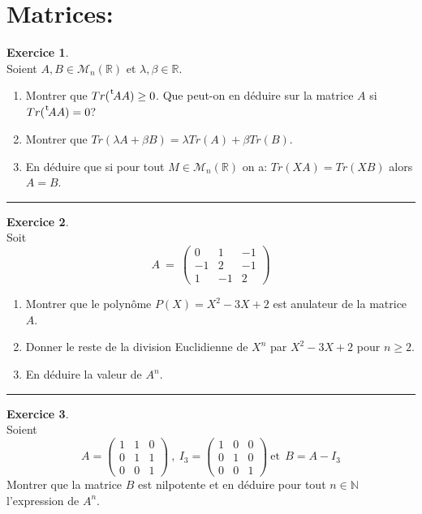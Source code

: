 \documentclass[a4paper,10pt]{article}
\theoremstyle{definition}
\theoremstyle{definition}
\newtheorem{exo}{Exercice}
\newcommand*{\transp}[2][-3mu]{\ensuremath{\mskip1mu\prescript{\smash{\mathrm t\mkern#1}}{}{\mathstrut#2}}}%
\newcommand{\R}{\mathbb{R}}
\newcommand{\N}{\mathbb{N}}
\begin{document}
\section*{Matrices:}
\begin{minipage}{1\linewidth}
\begin{minipage}[t]{0.48\linewidth}
\raggedright

\begin{exo}\quad\\
Soient  $A,B\in\mathcal{M}_{n}\left(\R\right)$ et $\lambda,\beta\in\R$.
\begin{enumerate}
\item Montrer que  $Tr(\transp{A}A) \geq 0$. Que peut-on en déduire sur la matrice $A$ si $Tr(\transp{A}A) = 0$?
\item Montrer que  $Tr(\lambda A + \beta B) = \lambda Tr(A) + \beta Tr(B)$.
\item En déduire que si pour tout $M\in \mathcal{M}_{n}\left(\R\right)$  on a: $Tr(XA) = Tr(XB) $ alors $A=B$.
\end{enumerate}

\centering\rule{1\linewidth}{0.6pt}
\end{exo}

\begin{exo}\quad\\
Soit $$A \ = \ \begin{pmatrix}
0 & 1 & -1\\
-1 &  2& -1\\
1 & -1 & 2
\end{pmatrix}$$
\begin{enumerate}
\item Montrer que le polynôme $P(X) = X^2-3X+2$ est anulateur de la matrice $A$.
\item Donner le reste de la division Euclidienne de $X^n$ par  $X^2-3X+2$ pour $n\geq 2$.
\item En déduire la valeur de $A^n$. 
\end{enumerate}

\centering
\rule{1\linewidth}{0.6pt}
\end{exo}

\end{minipage}	
\hfill\vrule\hfill
\begin{minipage}[t]{0.48\linewidth}
\raggedright

\begin{exo}\quad\\
Soient $$A  =  \begin{pmatrix}
1 & 1 & 0\\
0 &  1& 1\\
0 & 0& 1
\end{pmatrix} \ , \ I_3  =  \begin{pmatrix}
1 & 0 & 0\\
0 &  1& 0\\
0 & 0& 1
\end{pmatrix} \ \text{et}  \ \ B  =  A-I_3
$$
Montrer que la matrice $B$ est nilpotente et en déduire pour tout $n\in\N$ l'expression de $A^n$.


\end{exo}
\end{minipage}
\end{minipage}
\end{document}
